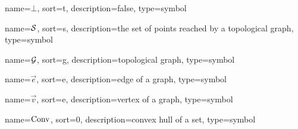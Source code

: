 	{%
		name=\ensuremath{\bot},
		sort=t,
		description=false,
		type=symbol
	}
	\newcommand{\false}{\gls{sym:false}}

	{%
		name=\ensuremath{\set{S}},
		sort=s,
		description=the set of points reached by a topological graph,
		type=symbol
	}
	\newcommand{\swath}{\gls{sym:swath}}

	{%
		name=\ensuremath{\set{G}},
		sort=g,
		description=topological graph,
		type=symbol
	}
	\newcommand{\topologicalgraph}{\gls{sym:topologicalgraph}}

	{%
		name=\ensuremath{\vec{e}},
		sort=e,
		description=edge of a graph,
		type=symbol
	}
	\newcommand{\edge}{\gls{sym:edge}}

	{%
		name=\ensuremath{\vec{v}},
		sort=e,
		description=vertex of a graph,
		type=symbol
	}
	\newcommand{\vertex}{\gls{sym:vertex}}

	{%
		name=\ensuremath{\func{Conv}},
		sort=0,
		description=convex hull of a set,
		type=symbol
	}
	\newcommand{\convexhull}{\gls{sym:convexhull}}


